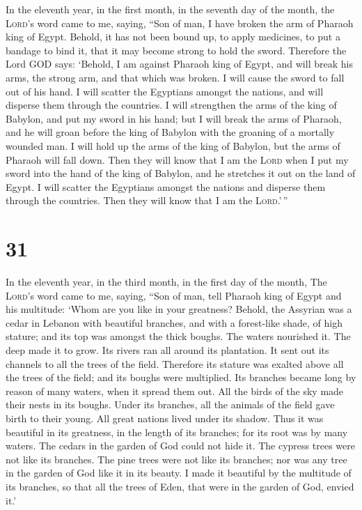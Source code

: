  In the eleventh year, in the first month, in the seventh
day of the month, the \textsc{Lord}'s word came to me, saying,
 ``Son of man, I have broken the arm of Pharaoh king of
Egypt. Behold, it has not been bound up, to apply medicines, to put a
bandage to bind it, that it may become strong to hold the sword.
 Therefore the Lord GOD says: `Behold, I am against
Pharaoh king of Egypt, and will break his arms, the strong arm, and that
which was broken. I will cause the sword to fall out of his hand.
 I will scatter the Egyptians amongst the nations, and
will disperse them through the countries.  I will
strengthen the arms of the king of Babylon, and put my sword in his
hand; but I will break the arms of Pharaoh, and he will groan before the
king of Babylon with the groaning of a mortally wounded man.
 I will hold up the arms of the king of Babylon, but the
arms of Pharaoh will fall down. Then they will know that I am the
\textsc{Lord} when I put my sword into the hand of the king of Babylon,
and he stretches it out on the land of Egypt.  I will
scatter the Egyptians amongst the nations and disperse them through the
countries. Then they will know that I am the \textsc{Lord}.'\,''

\hypertarget{section-30}{%
\section{31}\label{section-30}}

 In the eleventh year, in the third month, in the first
day of the month, The \textsc{Lord}'s word came to me, saying,
 ``Son of man, tell Pharaoh king of Egypt and his
multitude: `Whom are you like in your greatness?  Behold,
the Assyrian was a cedar in Lebanon with beautiful branches, and with a
forest-like shade, of high stature; and its top was amongst the thick
boughs.  The waters nourished it. The deep made it to
grow. Its rivers ran all around its plantation. It sent out its channels
to all the trees of the field.  Therefore its stature was
exalted above all the trees of the field; and its boughs were
multiplied. Its branches became long by reason of many waters, when it
spread them out.  All the birds of the sky made their
nests in its boughs. Under its branches, all the animals of the field
gave birth to their young. All great nations lived under its shadow.
 Thus it was beautiful in its greatness, in the length of
its branches; for its root was by many waters.  The cedars
in the garden of God could not hide it. The cypress trees were not like
its branches. The pine trees were not like its branches; nor was any
tree in the garden of God like it in its beauty.  I made
it beautiful by the multitude of its branches, so that all the trees of
Eden, that were in the garden of God, envied it.'

